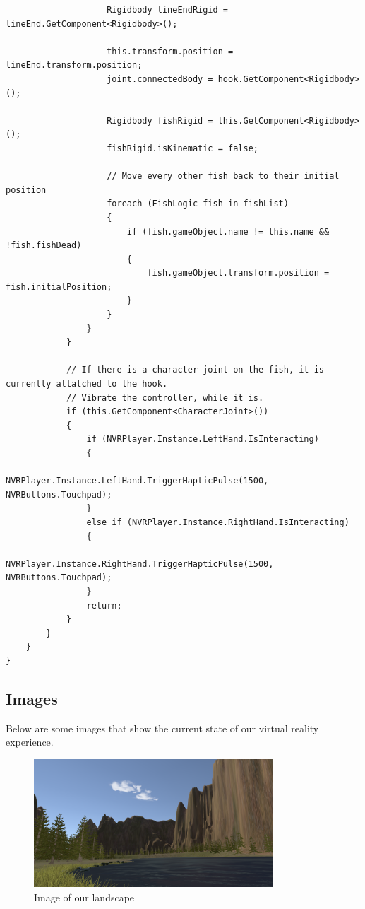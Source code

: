 \documentclass[10pt,journal,compsoc,onecolumn, draftclsnofoot]{IEEEtran}
\begin{document}
\begin{itemize}
\begin{verbatim}
                    Rigidbody lineEndRigid = lineEnd.GetComponent<Rigidbody>();

                    this.transform.position = lineEnd.transform.position;
                    joint.connectedBody = hook.GetComponent<Rigidbody>();

                    Rigidbody fishRigid = this.GetComponent<Rigidbody>();
                    fishRigid.isKinematic = false;

                    // Move every other fish back to their initial position
                    foreach (FishLogic fish in fishList)
                    {
                        if (fish.gameObject.name != this.name && !fish.fishDead)
                        {
                            fish.gameObject.transform.position = fish.initialPosition;
                        }
                    }
                }
            }

            // If there is a character joint on the fish, it is currently attatched to the hook.
            // Vibrate the controller, while it is.
            if (this.GetComponent<CharacterJoint>())
            {
                if (NVRPlayer.Instance.LeftHand.IsInteracting)
                {
                    NVRPlayer.Instance.LeftHand.TriggerHapticPulse(1500, NVRButtons.Touchpad);
                }
                else if (NVRPlayer.Instance.RightHand.IsInteracting)
                {
                    NVRPlayer.Instance.RightHand.TriggerHapticPulse(1500, NVRButtons.Touchpad);
                }
                return;
            }
        }
    }
}
\end{verbatim}

\subsection{Images}
Below are some images that show the current state of our virtual reality experience.

\vspace{1cm}

\begin{figure}[h]
    \centering
    \includegraphics[width=0.80\textwidth]{waterLeft.png}
    \caption{Image of our landscape}
\end{figure}


\end{itemize}
\end{document}
